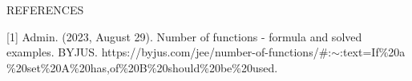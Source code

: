 \documentclass{article} %
\begin{document}
    \begin{center}
        REFERENCES
    \end{center}

    [1] Admin. (2023, August 29). Number of functions - formula and solved examples. BYJUS. https://byjus.com/jee/number-of-functions/$\#$:$\sim$:text=If$\%$20a$\%$20set$\%$20A$\%$20has,of$\%$20B$\%$20should$\%$20be$\%$20used.
    
\end{document}
